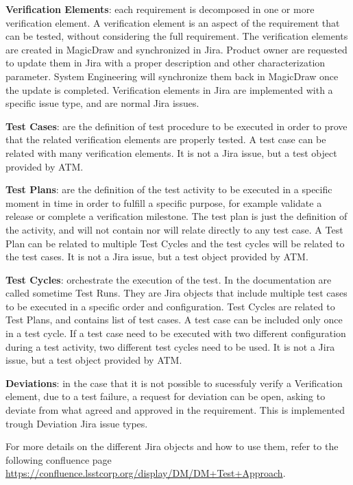 {\bf Verification Elements}: each requirement is decomposed in one or more verification element. A verification element is an aspect of the requirement that can be tested, without considering the full requirement. 
The verification elements are created in MagicDraw and synchronized in Jira. 
Product owner are requested to update them in Jira with a proper description and other characterization parameter.
System Engineering will synchronize them back in MagicDraw once the update is completed.
Verification elements in Jira are implemented with a specific issue type, and are normal Jira issues.

{\bf Test Cases}: are the definition of test procedure to be executed in order to prove that the related verification elements are properly tested. A test case can be related with many verification elements. It is not a Jira issue, but a test object provided by ATM.

{\bf Test Plans}: are the definition of the test activity to be executed in a specific moment in time in order to fulfill a specific purpose, for example validate a release or complete a verification milestone. 
The test plan is just the definition of the activity, and will not contain nor will relate directly to any test case. 
A Test Plan can be related to multiple Test Cycles and the test cycles will be related to the test cases. 
It is not a Jira issue, but a test object provided by ATM.

{\bf Test Cycles}: orchestrate the execution of the test. In the documentation are called sometime Test Runs.
They are Jira objects that include multiple test cases to be executed in a specific order and configuration. 
Test Cycles are related to Test Plans, and contains list of test cases. 
A test case can be included only once in a test cycle. If a test case need to be executed with two different configuration during a test activity, two different test cycles need to be used.
It is not a Jira issue, but a test object provided by ATM.

{\bf Deviations}: in the case that it is not possible to sucessfuly verify a Verification element, due to a test failure, a request for deviation can be open, asking to deviate from what agreed and approved in the requirement. 
This is implemented trough Deviation Jira issue types.

For more details on the different Jira objects and how to use them, refer to the following confluence page 
\url{https://confluence.lsstcorp.org/display/DM/DM+Test+Approach}.

